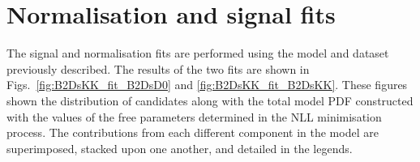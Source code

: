 



\section{Normalisation and signal fits}

The signal and normalisation fits are performed using the model and dataset previously described. The results of the two fits are shown in Figs.~\ref{fig:B2DsKK_fit_B2DsD0} and \ref{fig:B2DsKK_fit_B2DsKK}. These figures shown the distribution of \Bp candidates along with the total model PDF constructed with the values of the free parameters determined in the NLL minimisation process. The contributions from each different component in the model are superimposed, stacked upon one another, and detailed in the legends.

